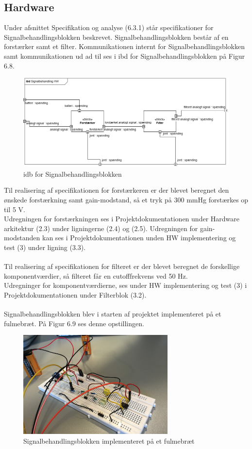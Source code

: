 \subsection{Hardware}
Under afsnittet Specifikation og analyse (6.3.1) står specifikationer for Signalbehandlingsblokken beskrevet. Signalbehandlingsblokken består af en forstærker samt et filter. Kommunikationen internt for Signalbehandlingsblokken samt kommunikationen ud ad til ses i ibd for Signalbehandlingsblokken på Figur 6.8.  

\begin{figure}[H]
	\centering
	\includegraphics[width=1\textwidth]{Figurer/5}
	\caption{idb for Signalbehandlingsblokken}
\end{figure}

Til realisering af specifikationen for forstærkeren er der blevet beregnet den ønskede forstærkning samt gain-modstand, så et tryk på 300 mmHg forstærkes op til 5 V.\\
Udregningen for forstærkningen ses i Projektdokumentationen under Hardware arkitektur (2.3) under ligningerne (2.4) og (2.5). Udregningen for gain-modstanden kan ses i Projektdokumentationen unden HW implementering og test (3) under ligning (3.3).  
\\\\
Til realisering af specifikationen for filteret er der blevet beregnet de forskellige komponentværdier, så filteret får en cutofffrekvens ved 50 Hz.\\
Udregninger for komponentværdierne, ses under HW implementering og test (3) i Projektdokumentationen under Filterblok (3.2). 
\\\\ 
Signalbehandlingsblokken blev i starten af projektet implementeret på et fulmebræt. På Figur 6.9 ses denne opstillingen. 

\begin{figure}[H]
	\centering
	\includegraphics[width=0.7\textwidth]{Figurer/Snip20151213_83}
	\caption{Signalbehandlingsblokken implementeret på et fulmebræt}
\end{figure} 

